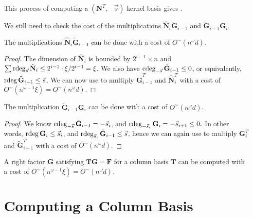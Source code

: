 This process of computing a $\left(\mathbf{N}^{T},-\vec{s}\right)$-kernel
basis gives .

We still need to check the cost of the multiplications $\hat{\mathbf{N}}_{i}\tilde{\mathbf{G}}_{i-1}$
and $\tilde{\mathbf{G}}_{i-1}\mathbf{G}_{i}$.
\begin{lem}
The multiplications $\hat{\mathbf{N}}_{i}\tilde{\mathbf{G}}_{i-1}$
can be done with a cost of $O^{\sim}\left(n^{\omega}d\right)$.\end{lem}
\begin{proof}
The dimension of $\hat{\mathbf{N}}_{i}$ is bounded by $2^{i-1}\times n$
and $\sum\rdeg_{\vec{s}}\hat{\mathbf{N}}_{i}\le2^{i-1}\cdot\xi/2^{i-1}=\xi$.
We also have $\cdeg_{-\vec{s}}\tilde{\mathbf{G}}_{i-1}\le0$, or equivalently,
$\rdeg\tilde{\mathbf{G}}_{i-1}\le\vec{s}$. We can now use 
to multiply $\tilde{\mathbf{G}}_{i-1}^{T}$ and $\hat{\mathbf{N}}_{i}^{T}$
with a cost of $O^{\sim}\left(n^{\omega-1}\xi\right)=O^{\sim}\left(n^{\omega}d\right)$.\end{proof}
\begin{lem}
The multiplication $\tilde{\mathbf{G}}_{i-1}\mathbf{G}_{i}$ can be
done with a cost of $O^{\sim}\left(n^{\omega}d\right)$.\end{lem}
\begin{proof}
We know $\cdeg_{-\vec{s}}\tilde{\mathbf{G}}_{i-1}=-\vec{s}_{i}$,
and $\cdeg_{-\vec{s}_{i}}\mathbf{G}_{i}=-\vec{s}_{i+1}\le0.$ In other
words, $\rdeg\mathbf{G}_{i}\le\vec{s}_{i}$, and $\rdeg_{\vec{s}_{i}}\tilde{\mathbf{G}}_{i-1}\le\vec{s}$,
hence we can again use 
to multiply $\mathbf{G}_{i}^{T}$ and $\tilde{\mathbf{G}}_{i-1}^{T}$
with a cost of $O^{\sim}\left(n^{\omega}d\right)$.\end{proof}
\begin{thm}
A right factor $\mathbf{G}$ satisfying $\mathbf{TG}=\mathbf{F}$
for a column basis $\mathbf{T}$ can be computed with a cost of $O^{\sim}\left(n^{\omega-1}\xi\right)=O^{\sim}\left(n^{\omega}d\right)$.
\end{thm}

\section{Computing a Column Basis}

